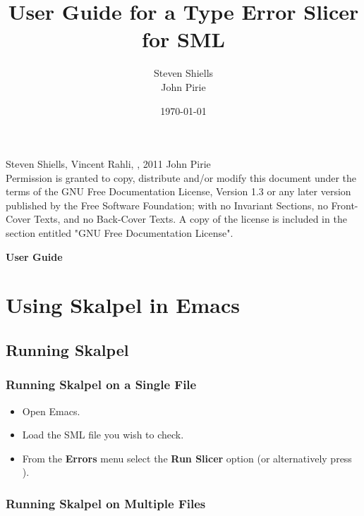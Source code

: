 \documentclass{article}
\title{User Guide for a Type Error Slicer for SML}
\author{Steven Shiells\\ John Pirie}
\date{\today}
\begin{document}
\maketitle
\vspace{110mm}
\small{
\noindent {} Steven Shiells,  Vincent Rahli, , 2011 John Pirie
\\
Permission is granted to copy, distribute and/or modify this document
under the terms of the GNU Free Documentation License, Version 1.3 or
any later version published by the Free Software Foundation; with no
Invariant Sections, no Front-Cover Texts, and no Back-Cover Texts.  A
copy of the license is included in the section entitled "GNU Free
Documentation License".}

\newpage

\tableofcontents

\newpage
\textbf{\LARGE User Guide}

\section{Using Skalpel in Emacs}


\subsection{Running Skalpel}


\subsubsection{Running Skalpel on a Single File}

\begin{itemize}
\item Open Emacs.
\item Load the SML file you wish to check.
\item From the \textbf{Errors} menu select the \textbf{Run Slicer}
  option (or alternatively press ).
\end{itemize}

\subsubsection{Running Skalpel on Multiple Files}
\end{document}

